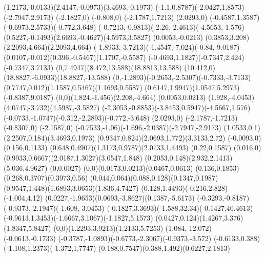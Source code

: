 {    \rcurveto(1.2173,-0.0133)(2.4147,-0.0973)(3.4693,-0.1973)
    \rcurveto(-1.1,0.8787)(-2.0427,1.8573)(-2.7947,2.9173)
    \rlineto(-2.1827,0)
    \rlineto(-0.808,0)
    \rlineto(-2.1787,1.7213)
    \rlineto(2.0293,0)
    \rcurveto(-0.4587,1.3587)(-0.6973,2.5733)(-0.772,3.648)
    \rcurveto(-0.7213,-0.9813)(-2.26,-2.4613)(-4.5653,-1.576)
    \rcurveto(0.5227,-0.1493)(2.6693,-0.4627)(4.5973,3.5827)
    \rlineto(0.0053,-0.0213)
    \rcurveto(0.3853,3.208)(2.2093,4.664)(2.2093,4.664)
    \rcurveto(-1.8933,-3.7213)(-1.4547,-7.024)(-0.84,-9.0187)
    \rcurveto(0.0107,-0.012)(0.396,-0.5467)(1.1707,-0.5587)
    \rcurveto(-0.4693,1.1827)(-0.7347,2.424)(-0.7347,3.7133)
    \rcurveto(0,7.4947)(8.472,13.588)(18.8813,13.588)
    \rcurveto(10.412,0)(18.8827,-6.0933)(18.8827,-13.588)
    \rcurveto(0,-1.2893)(-0.2653,-2.5307)(-0.7333,-3.7133)
    \rcurveto(0.7747,0.012)(1.1587,0.5467)(1.1693,0.5587)
    \rcurveto(0.6147,1.9947)(1.0547,5.2973)(-0.8387,9.0187)
    \rcurveto(0,0)(1.824,-1.456)(2.208,-4.664)
    \rlineto(0.0053,0.0213)
    \rcurveto(1.928,-4.0453)(4.0747,-3.732)(4.5987,-3.5827)
    \rcurveto(-2.3053,-0.8853)(-3.8453,0.5947)(-4.5667,1.576)
    \rcurveto(-0.0733,-1.0747)(-0.312,-2.2893)(-0.772,-3.648)
    \rlineto(2.0293,0)
    \rlineto(-2.1787,-1.7213)
    \rlineto(-0.8307,0)
    \rlineto(-2.1587,0)
    \rcurveto(-0.7533,-1.06)(-1.696,-2.0387)(-2.7947,-2.9173)
    \rcurveto(1.0533,0.1)(2.2507,0.184)(3.4693,0.1973)
    \rcurveto(0.9347,0.824)(2.0693,1.772)(3.3133,2.72)
    \rlineto(-0.0093,0)
    \rlineto(0.156,0.1133)
    \rcurveto(0.648,0.4907)(1.3173,0.9787)(2.0133,1.4493)
    \rlineto(0.22,0.1587)
    \rlineto(0.016,0)
    \rcurveto(0.9933,0.6667)(2.0187,1.3027)(3.0547,1.848)
    \rcurveto(0.2053,0.148)(2.932,2.1413)(5.036,4.9627)
    \rlineto(0,0.0027)
    \rcurveto(0,0)(0.0173,0.0213)(0.0467,0.0613)
    \rcurveto(0.136,0.1853)(0.268,0.3707)(0.3973,0.56)
    \rcurveto(0.044,0.064)(0.088,0.128)(0.1347,0.1987)
    \rcurveto(0.9547,1.448)(1.6893,3.0653)(1.836,4.7427)
    \rcurveto(0.128,1.4493)(-0.216,2.828)(-1.004,4.12)
    \rcurveto(0.0227,-1.9653)(0.0693,-3.8627)(0.1387,-5.6173)
    \rcurveto(-0.3293,-0.8187)(-0.9373,-2.1947)(-1.608,-3.0453)
    \rcurveto(-0.1827,3.3693)(-1.588,32.34)(-0.1427,40.4613)
    \rcurveto(-0.9613,1.3453)(-1.6667,3.1067)(-1.1827,5.1573)
    \rcurveto(0.0427,0.124)(1.4267,3.376)(1.8347,5.8427)
    \rcurveto(0,0)(1.2293,3.9213)(1.2133,5.7253)
    \rlineto(1.084,-12.072)
    \rlineto(-0.0613,-0.1733)
    \rcurveto(-0.3787,-1.0893)(-0.6773,-2.3067)(-0.9373,-3.572)
    \rcurveto(-0.6133,0.388)(-1.108,1.2373)(-1.372,1.7747)
    \rcurveto(0.188,0.7547)(0.388,1.492)(0.6227,2.1813)
}
